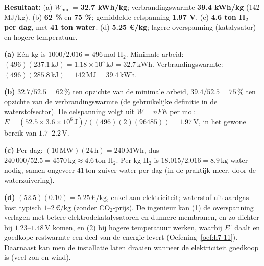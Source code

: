 \begin{oplossing}
\textbf{Resultaat:} (a) \(W_{\min}\) = \textbf{32.7 kWh/kg}; verbrandingswarmte \textbf{39.4 kWh/kg} (142 MJ/kg). (b) \textbf{62 \%} en \textbf{75 \%}; gemiddelde celspanning \textbf{1.97 V}. (c) \textbf{4.6 ton H\ensuremath{_{2}} per dag}, met \textbf{41 ton water}. (d) \textbf{5.25 €/kg}; lagere overspanning (katalysator) en hogere temperatuur.

\textbf{(a)} Eén kg is \(1000/2.016 = 496\,\mathrm{mol}\) \(\mathrm{H_2}\). Minimale arbeid: \((496)(237.1\,\mathrm{kJ}) = 1.18\times10^{5}\,\mathrm{kJ} = 32.7\,\mathrm{kWh}\). Verbrandingswarmte: \((496)(285.8\,\mathrm{kJ}) = 142\,\mathrm{MJ} = 39.4\,\mathrm{kWh}\).

\textbf{(b)} \(32.7/52.5 = 62\,\%\) ten opzichte van de minimale arbeid, \(39.4/52.5 = 75\,\%\) ten opzichte van de verbrandingswarmte (de gebruikelijke definitie in de waterstofsector). De celspanning volgt uit \(W = nFE\) per mol: \(E = (52.5 \times 3.6\times10^{6}\,\mathrm{J})/((496)(2)(96485)) = 1.97\,\mathrm{V}\), in het gewone bereik van \(1.7\)--\(2.2\,\mathrm{V}\).

\textbf{(c)} Per dag: \((10\,\mathrm{MW})(24\,\mathrm{h}) = 240\,\mathrm{MWh}\), dus \(240\,000/52.5 = 4570\,\mathrm{kg} \approx 4.6\,\mathrm{ton}\) \(\mathrm{H_2}\). Per kg \(\mathrm{H_2}\) is \(18.015/2.016 = 8.9\,\mathrm{kg}\) water nodig, samen ongeveer \(41\,\mathrm{ton}\) zuiver water per dag (in de praktijk meer, door de waterzuivering).

\textbf{(d)} \((52.5)(0.10) = 5.25\,\text{€/kg}\), enkel aan elektriciteit; waterstof uit aardgas kost typisch \(1\)--\(2\,\text{€/kg}\) (zonder \(\mathrm{CO_2}\)-prijs). De ingenieur kan (1) de overspanning verlagen met betere elektrodekatalysatoren en dunnere membranen, en zo dichter bij \(1.23\)--\(1.48\,\mathrm{V}\) komen, en (2) bij hogere temperatuur werken, waarbij \(E^\circ\) daalt en goedkope restwarmte een deel van de energie levert (Oefening~\ref{oef:h7-11}). Daarnaast kan men de installatie laten draaien wanneer de elektriciteit goedkoop is (veel zon en wind).
\end{oplossing}

